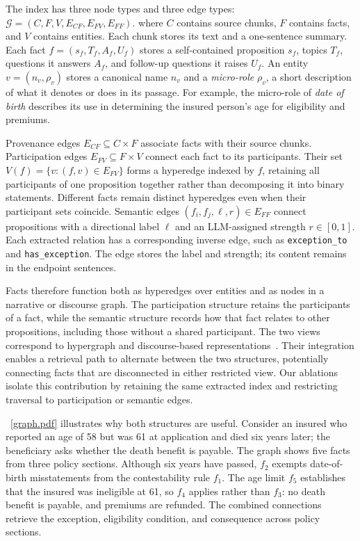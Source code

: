 \documentclass[sigconf, review, anonymous]{acmart}
\begin{document}
The index has three node types and three edge types:
$\mathcal{G}=(C,F,V,E_{CF},E_{FV},E_{FF}).$
where $C$ contains source chunks, $F$ contains facts, and $V$ contains
entities. Each chunk stores its text and a one-sentence summary. Each fact
$f=(s_f,T_f,A_f,U_f)$ stores a self-contained proposition $s_f$, topics
$T_f$, questions it answers $A_f$, and follow-up questions it raises $U_f$.
An entity $v=(n_v,\rho_v)$ stores a canonical name $n_v$ and a
\emph{micro-role} $\rho_v$, a short description of what it denotes or does
in its passage. For example, the micro-role of \emph{date of birth} describes
its use in determining the insured person's age for eligibility and premiums.

Provenance edges $E_{CF}\subseteq C\times F$ associate facts with their
source chunks. Participation edges $E_{FV}\subseteq F\times V$ connect
each fact to its participants. Their set
$V(f)=\{v:(f,v)\in E_{FV}\}$ forms a hyperedge indexed by $f$, retaining
all participants of one proposition together rather than decomposing it into
binary statements. Different facts remain distinct hyperedges even when their
participant sets coincide. Semantic edges
$(f_i,f_j,\ell,r)\in E_{FF}$ connect propositions with a directional label
$\ell$ and an LLM-assigned strength $r\in[0,1]$. Each extracted relation
has a corresponding inverse edge, such as \texttt{exception\_to} and
\texttt{has\_exception}. The edge stores the label and strength; its content
remains in the endpoint sentences.

Facts therefore function both as hyperedges over entities and as nodes in a
narrative or discourse graph. The participation structure retains the
participants of a fact, while the semantic structure records how that fact
relates to other propositions, including those without a shared participant.
The two views correspond to hypergraph and discourse-based
representations~\cite{luo2025hypergraphrag,prasad2017penn}.
Their integration enables a retrieval path to alternate between the two
structures, potentially connecting facts that are disconnected in either
restricted view. Our ablations isolate this contribution by retaining the same
extracted index and restricting traversal to participation or semantic edges.

~\autoref{graph.pdf} illustrates why both structures
are useful. Consider an insured who reported an age of 58 but was 61 at
application and died six years later; the beneficiary asks whether the death
benefit is payable. The graph shows five facts from three policy sections. Although six years have passed, $f_2$ exempts date-of-birth
misstatements from the contestability rule $f_1$. The age limit
$f_5$ establishes that the insured was ineligible at 61, so $f_4$
applies rather than $f_3$: no death benefit is payable, and premiums
are refunded. The combined connections retrieve the exception,
eligibility condition, and consequence across policy sections.
\end{document}

